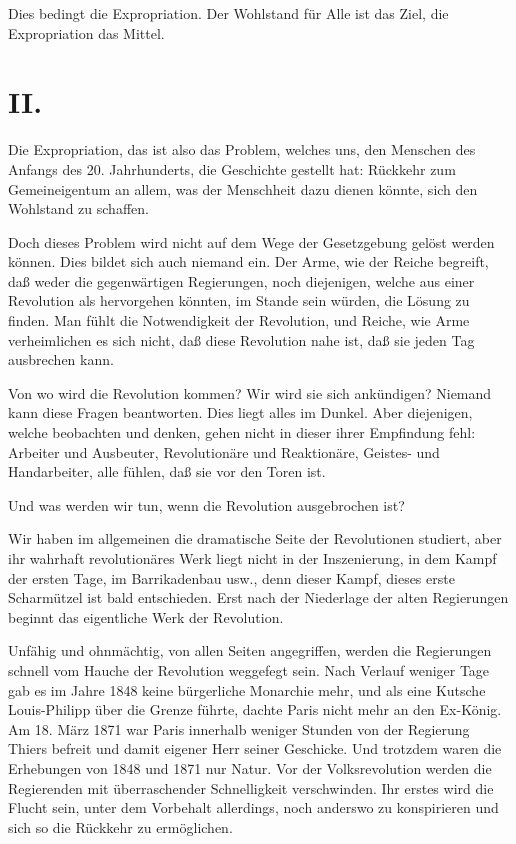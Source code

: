 \documentclass{scrbook}
\begin{document}
Dies bedingt die Expropriation. Der Wohlstand für Alle ist das Ziel, die Expropriation das Mittel.

\section*{II.}

Die Expropriation, das ist also das Problem, welches uns, den Menschen des Anfangs des 20. Jahrhunderts, die Geschichte gestellt hat: Rückkehr zum Gemeineigentum an allem, was der Menschheit dazu dienen könnte, sich den Wohlstand zu schaffen.

Doch dieses Problem wird nicht auf dem Wege der Gesetzgebung gelöst werden können. Dies bildet sich auch niemand ein. Der Arme, wie der Reiche begreift, daß weder die gegenwärtigen Regierungen, noch diejenigen, welche aus einer  Revolution als  hervorgehen könnten, im Stande sein würden, die Lösung zu finden. Man fühlt die Notwendigkeit der  Revolution, und Reiche, wie Arme verheimlichen es sich nicht, daß diese Revolution nahe ist, daß sie jeden Tag ausbrechen kann.

Von wo wird die Revolution kommen? Wir wird sie sich ankündigen? Niemand kann diese Fragen beantworten. Dies liegt alles im Dunkel. Aber diejenigen, welche beobachten und denken, gehen nicht in dieser ihrer Empfindung fehl: Arbeiter und Ausbeuter, Revolutionäre und Reaktionäre, Geistes- und Handarbeiter, alle fühlen, daß sie vor den Toren ist.

Und was werden wir tun, wenn die Revolution ausgebrochen ist?

Wir haben im allgemeinen die dramatische Seite der Revolutionen studiert, aber ihr wahrhaft revolutionäres Werk liegt nicht in der Inszenierung, in dem Kampf der ersten Tage, im Barrikadenbau usw., denn dieser Kampf, dieses erste Scharmützel ist bald entschieden. Erst nach der Niederlage der alten Regierungen beginnt das eigentliche Werk der Revolution.

Unfähig und ohnmächtig, von allen Seiten angegriffen, werden die Regierungen schnell vom Hauche der Revolution weggefegt sein. Nach Verlauf weniger Tage gab es im Jahre 1848 keine bürgerliche Monarchie mehr, und als eine Kutsche Louis-Philipp über die Grenze führte, dachte Paris nicht mehr an den Ex-König. Am 18. März 1871 war Paris innerhalb weniger Stunden von der Regierung Thiers befreit und damit eigener Herr seiner Geschicke. Und trotzdem waren die Erhebungen von 1848 und 1871 nur  Natur. Vor der Volksrevolution werden die Regierenden mit überraschender Schnelligkeit verschwinden. Ihr erstes wird die Flucht sein, unter dem Vorbehalt allerdings, noch anderswo zu konspirieren und sich so die Rückkehr zu ermöglichen.
\end{document}
